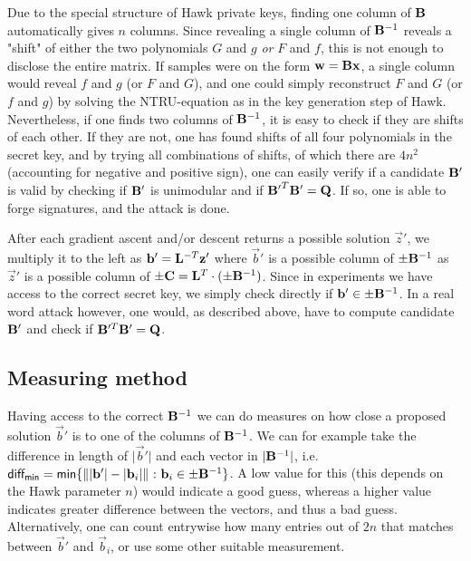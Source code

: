 Due to the special structure of Hawk private keys, finding one column of $\mathbf{B}$ automatically gives $n$ columns.
Since revealing a single column of $ \mathbf{B}^{-1}$ reveals a "shift" of either the two polynomials $G$ and $ g$ \textit{or} $F$ and $f$,
this is not enough to disclose the entire matrix. If samples were on the form $\mathbf{w} = \mathbf{B} \mathbf{x}$, a single column would reveal $f$ and $g$ (or $F$ and $G$), and one could simply reconstruct $F$ and $G$ (or $f$ and $g$)
by solving the NTRU-equation as in the key generation step of Hawk.
Nevertheless, if one finds two columns of $\mathbf{B}^{-1}$, it is easy to check if they are shifts of each other. If they are not, one has found shifts of all four polynomials in the secret key, 
and by trying all combinations of shifts, of which there are $4 n^2$ (accounting for negative and positive sign), one can easily verify if a candidate $\mathbf{B'}$ is valid by 
checking if $\mathbf{B}'$ is unimodular and if $\mathbf{B'}^T \mathbf{B'} = \mathbf{Q}$. If so, one is able to forge signatures, and the attack is done.

After each gradient ascent and/or descent returns a possible solution $\vec{z}'$, 
we multiply it to the left as $\mathbf{b}' = \mathbf{L}^{-T} \mathbf{z}'$ where $\vec{b}'$ is a possible column of $\pm \mathbf{B}^{-1}$ as $\vec{z}'$ is a possible column of $\pm \mathbf{C} = \mathbf{L}^T \cdot (\pm \mathbf{B}^{-1})$.
Since in experiments we have access to the correct secret key, we simply check directly if $\mathbf{b}' \in \pm \mathbf{B}^{-1}$.
In a real word attack however, one would, as described above, have to compute candidate $\mathbf{B}'$ and check if $\mathbf{B}'^T\mathbf{B}' = \mathbf{Q}$.

\subsection{Measuring method}
Having access to the correct $\mathbf{B}^{-1}$ we can do measures on how close a proposed solution $\vec{b}'$ is to one of the columns of $\mathbf{B}^{-1}$.
We can for example take the difference in length of $\lvert \vec{b}' \rvert $ and each vector in $\lvert \mathbf{B}^{-1}\rvert$, i.e. 
$ \mathsf{diff_{min}} = \mathsf{min} \{\lVert \lvert \vec{b}' \rvert - \lvert \vec{b}_i \rvert \rVert \ \mathbf{:} \ \vec{b}_i \in \pm \mat{B}^{-1}\}$.
A low value for this (this depends on the Hawk parameter $n$) would indicate a good guess, whereas a higher value indicates greater difference between the vectors, and thus a bad guess.
Alternatively, one can count entrywise how many entries out of $2n$ that matches between $\vec{b}'$ and $\vec{b}_i$, or use some other suitable measurement.

